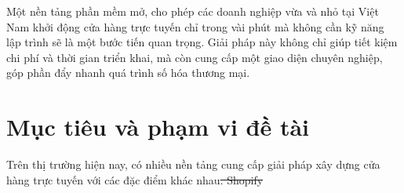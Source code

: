 \documentclass[../main.tex]{subfiles}
\providecommand{\DIFadd}[1]{{\protect\color{blue}\uwave{#1}}} %
\providecommand{\DIFdel}[1]{{\protect\color{red}\sout{#1}}} %
\providecommand{\DIFaddbegin}{} %
\providecommand{\DIFdelbegin}{} %
\providecommand{\DIFdelend}{} %
\begin{document}
Một nền tảng phần mềm mở, cho phép các doanh nghiệp vừa và nhỏ tại Việt Nam khởi động cửa hàng trực tuyến chỉ trong vài phút mà không cần kỹ năng lập trình sẽ là một bước tiến quan trọng. Giải pháp này không chỉ giúp tiết kiệm chi phí và thời gian triển khai, mà còn cung cấp một giao diện chuyên nghiệp, góp phần đẩy nhanh quá trình số hóa thương mại.

\section{Mục tiêu và phạm vi đề tài}
\label{section:1.2}

Trên thị trường hiện nay, có nhiều nền tảng cung cấp giải pháp xây dựng cửa hàng trực tuyến với các đặc điểm khác nhau\DIFdelbegin \DIFdel{. Shopify }\DIFdelend \DIFaddbegin \DIFadd{:
}
\end{document}
